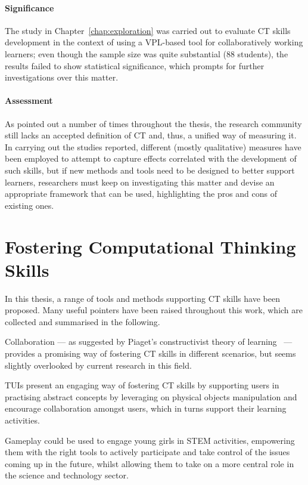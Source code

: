 \paragraph{Significance} The study in Chapter~\ref{chap:exploration} was carried out to evaluate \ac{CT} skills development in the context of using a \ac{VPL}-based tool for collaboratively working learners; even though the sample size was quite substantial (88 students), the results failed to show statistical significance, which prompts for further investigations over this matter.

\paragraph{Assessment} As pointed out a number of times throughout the thesis, the research community still lacks an accepted definition of \ac{CT} and, thus, a unified way of measuring it. In carrying out the studies reported, different (mostly qualitative) measures have been employed to attempt to capture effects correlated with the development of such skills, but if new methods and tools need to be designed to better support learners, researchers must keep on investigating this matter and devise an appropriate framework that can be used, highlighting the pros and cons of existing ones.

\section{Fostering Computational Thinking Skills}
In this thesis, a range of tools and methods supporting \ac{CT} skills have been proposed. Many useful pointers have been raised throughout this work, which are collected and summarised in the following.

Collaboration --- as suggested by Piaget's con\-struc\-tiv\-ist the\-o\-ry of learn\-ing~\cite{Piaget:1969vq} --- pro\-vides a prom\-is\-ing way of fostering \ac{CT} skills in different scenarios, but seems slightly overlooked by current research in this field.

\acp{TUI} present an engaging way of fostering \ac{CT} skills by supporting users in practising abstract concepts by leveraging on physical objects manipulation and encourage collaboration amongst users, which in turns support their learning activities.

Gameplay could be used to engage young girls in \ac{STEM} activities, empowering them with the right tools to actively participate and take control of the issues coming up in the future, whilst allowing them to take on a more central role in the science and technology sector.

